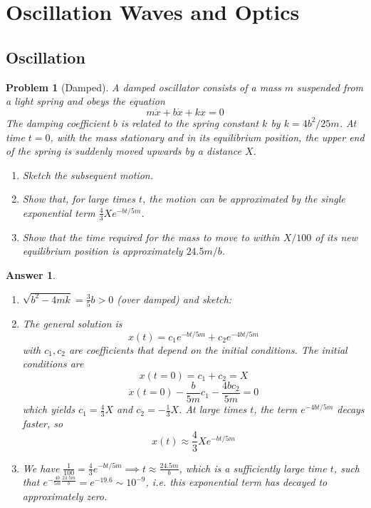 \documentclass[a4paper]{article}
\newtheorem{ans}{Answer}[section]
\theoremstyle{new}
\newtheorem{qns}{Problem}[section]
\begin{document}
\section{Oscillation Waves and Optics}
\subsection{Oscillation}
\begin{qns}[Damped]
A damped oscillator consists of a mass $m$ suspended from a light spring and obeys the equation
$$m\ddot{x}+b\dot{x}+kx=0$$
The damping coefficient $b$ is related to the spring constant $k$ by $k=4b^2/25m$. At time $t = 0$, with the mass stationary and in its equilibrium position, the upper end of the spring is suddenly moved upwards by a distance $X$.
\begin{enumerate}[label=(\alph*)]
    \item Sketch the subsequent motion. 
    \item Show that, for large times $t$, the motion can be approximated by the single exponential term $\frac{4}{3}Xe^{-bt/5m}$.
    \item Show that the time required for the mass to move to within $X/100$ of its new equilibrium position is approximately $24.5m/b$.
\end{enumerate}
\end{qns}
\begin{ans}\leavevmode
\begin{enumerate}[label=(\alph*)]
\item $\sqrt{b^2-4mk}=\frac{3}{5}b>0$ (over damped) and sketch:
\begin{center}
\end{center}
\item The general solution is
$$x(t)=c_1e^{-bt/5m}+c_2e^{-4bt/5m}$$
with $c_1,c_2$ are coefficients that depend on the initial conditions. The initial conditions are $$x(t=0)=c_1+c_2=X$$ $$\dot{x}(t=0)-\frac{b}{5m}c_1-\frac{4bc_2}{5m}=0$$
which yields $c_1=\frac{4}{3}X$ and $c_2=-\frac{1}{3}X$. At large times $t$, the term $e^{-4bt/5m}$ decays faster, so $$x(t)\approx\frac{4}{3}Xe^{-bt/5m}$$
\item We have $\frac{1}{100}=\frac{4}{3}e^{-bt/5m}\implies t\approx\frac{24.5m}{b}$, which is a sufficiently large time $t$, such that $e^{-\frac{4b}{5m}\frac{24.5m}{b}}=e^{-19.6}\sim 10^{-9}$, i.e. this exponential term has decayed to approximately zero.
\end{enumerate}
\end{ans}
\end{document}
